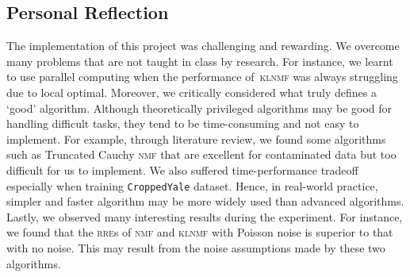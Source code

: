 \begin{table}
\caption{Average of evaluations metrics over 10 Monte-Carlo simulations using CroppedYale data set.}
\centering
{}
\end{table}
\subsection{Personal Reflection}
The implementation of this project was challenging and rewarding. We overcome many problems that are not taught in class by research. For instance, we learnt to use parallel computing when the performance of~\textsc{klnmf} was always struggling due to local optimal. 
Moreover, we critically considered what truly defines a `good' algorithm. Although theoretically privileged algorithms may be good for handling difficult tasks, they tend to be time-consuming and not easy to implement. For example, through literature review, we found some algorithms such as Truncated Cauchy \textsc{nmf} \citet{guan2017truncated} that are excellent for contaminated data but too difficult for us to implement. We also suffered time-performance tradeoff especially when training \texttt{CroppedYale} dataset. Hence, in real-world practice, simpler and faster algorithm may be more widely used than advanced algorithms. 
Lastly, we observed many interesting results during the experiment. For instance, we found that the \textsc{rre}s of \textsc{nmf} and \textsc{klnmf} with Poisson noise is superior to that with no noise. %
This may result from the noise assumptions made by these two algorithms. 
